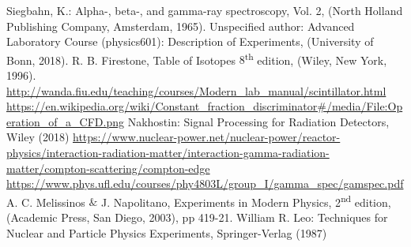 \documentclass[twocolumn]{article}
\begin{document}
\begin{thebibliography}{9}

Siegbahn, K.: Alpha-, beta-, and gamma-ray spectroscopy, Vol. 2, (North Holland Publishing Company, Amsterdam, 1965).
Unspecified author: Advanced Laboratory Course (physics601): Description of Experiments, (University of Bonn, 2018).
R. B. Firestone, Table of Isotopes $8$\textsuperscript{th} edition, (Wiley, New York, 1996).
 \url{http://wanda.fiu.edu/teaching/courses/Modern_lab_manual/scintillator.html}
\url{https://en.wikipedia.org/wiki/Constant_fraction_discriminator#/media/File:Operation_of_a_CFD.png}
Nakhostin: Signal Processing for Radiation Detectors, Wiley (2018)
\url{https://www.nuclear-power.net/nuclear-power/reactor-physics/interaction-radiation-matter/interaction-gamma-radiation-matter/compton-scattering/compton-edge}
\url{https://www.phys.ufl.edu/courses/phy4803L/group_I/gamma_spec/gamspec.pdf}
A. C. Melissinos $\&$ J. Napolitano, Experiments in Modern Physics, 2\textsuperscript{nd} edition, (Academic Press, San Diego, 2003), pp 419-21.
William R. Leo: Techniques for Nuclear and Particle Physics Experiments, Springer-Verlag (1987)
\end{thebibliography}
\end{document}
